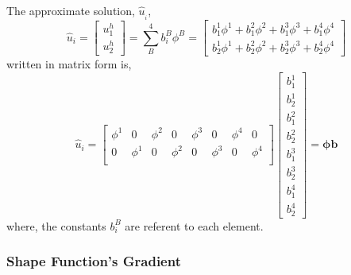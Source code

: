\documentclass[11pt, a4paper]{article}
\numberwithin{equation}{section}
\begin{document}
The approximate solution, $\hat{u}_{_i}$, 
\begin{equation}
\hat{u}_i  =
\begin{bmatrix}
u^h_{1} \\[0.3cm]
u^h_{2}
\end{bmatrix}
=\sum_B^4
b^B_i \phi^B =
\begin{bmatrix}
 b^1_{1} \phi^1 + b^2_{1} \phi^2 + b^3_{1} \phi^3 + b^4_{1} \phi^4 \\[0.3cm]
 b^1_{2} \phi^1 + b^2_{2} \phi^2 + b^3_{2} \phi^3 + b^4_{2} \phi^4 
 \end{bmatrix}
\end{equation}
written in matrix form is,
\begin{equation}
\hat{u}_i =
\begin{bmatrix}
\phi^1  & 0 & \phi^2 & 0& \phi^3 & 0 & \phi^4 & 0\\
0 & \phi^1 & 0 &\phi^2  &0 & \phi^3 & 0 & \phi^4\\
\end{bmatrix}
\begin{bmatrix}
b^1_{1} \\[0.15cm]
b^1_{2} \\[0.15cm]
b^2_{1} \\[0.15cm]
b^2_{2} \\[0.15cm]
b^3_{1} \\[0.15cm]
b^3_{2} \\[0.15cm]
b^4_{1} \\[0.15cm]
b^4_{2} 
\end{bmatrix} = \boldsymbol \phi \mathbf{b}
\end{equation}
where, the constants $b^B_i$ are referent to each element.

\subsubsection{Shape Function's Gradient}
\end{document}
